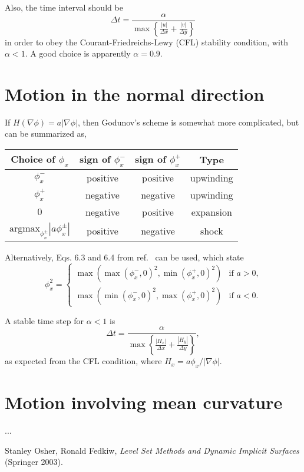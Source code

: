 \documentclass{article}
\newcommand{\be}{\begin{equation}}
\newcommand{\ee}{\end{equation}}
\newcommand{\grad}{\nabla}
\begin{document}
Also, the time interval should be 
\be \Delta t = \frac{\alpha} 
    {\max\left\{\frac{|u|}{\Delta x} + \frac{|v|}{\Delta y} \right\}} \ee
in order to obey the Courant-Friedreichs-Lewy (CFL) stability condition, with $\alpha < 1$. A good choice is apparently $\alpha = 0.9$.

\section{Motion in the normal direction}
If $H(\grad \phi) = a |\grad \phi|$, then Godunov's scheme is somewhat more complicated, but can be summarized as,

\begin{center}
\begin{tabular}{c|c c c}
Choice of $\phi_x$ & sign of $\phi_x^-$ & sign of $\phi_x^+$ & Type \\ \hline
$\phi_x^-$ & positive & positive & upwinding \\
$\phi_x^+$ & negative & negative & upwinding \\
$0$ & negative & positive & expansion \\
$\text{argmax}_{\phi_x^\pm}|a\phi_x^\pm|$ & positive & negative & shock 
\end{tabular}
\end{center}

Alternatively, Eqs. 6.3 and 6.4 from ref.~\cite{OF} can be used, which state
\be \phi_x^2 = \begin{cases}
    \max(\max(\phi_x^-,0)^2, \min(\phi_x^+,0)^2) & \text{if $a > 0$,} \\
    \max(\min(\phi_x^-,0)^2, \max(\phi_x^+,0)^2) & \text{if $a < 0$.} 
    \end{cases} \ee

A stable time step for $\alpha < 1$ is 
\be \Delta t = \frac{\alpha}{\max\left\{\frac{|H_x|}
    {\Delta x} + \frac{|H_y|}{\Delta y}\right\}}, \ee
as expected from the CFL condition, where $H_x = a \phi_x / |\grad \phi|$.

\section{Motion involving mean curvature}
...

\begin{thebibliography}{99}
 Stanley Osher, Ronald Fedkiw, \emph{Level Set Methods and Dynamic Implicit Surfaces} (Springer 2003).
\end{thebibliography}
\end{document}
